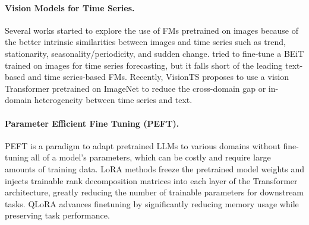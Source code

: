 
\paragraph{Vision Models for Time Series.} Several works started to explore the use of FMs pretrained on images because of the better intrinsic similarities between images and time series such as trend, stationarity, seasonality/periodicity, and sudden change. 
\citet{Zhou2023One} tried to fine-tune a BEiT \citep{Bao2021BEiT} trained on images for time series forecasting, but it falls short of the leading text-based and time series-based FMs.
Recently, VisionTS \citep{Chen2024Visionts} proposes to use a vision Transformer pretrained on ImageNet to reduce the cross-domain gap or in-domain heterogeneity between time series and text.





\paragraph{Parameter Efficient Fine Tuning (PEFT).} 
PEFT \citep{peft} is a paradigm to adapt pretrained LLMs to various domains without fine-tuning all of a model’s parameters, which can be costly and require large amounts of training data. %
LoRA \citep{LoRA} methods freeze the pretrained model weights and injects trainable rank decomposition matrices into each layer of the Transformer architecture, greatly reducing the number of trainable parameters for downstream tasks. 
QLoRA \citep{QLoRA} advances finetuning by significantly reducing memory usage while preserving task performance.

